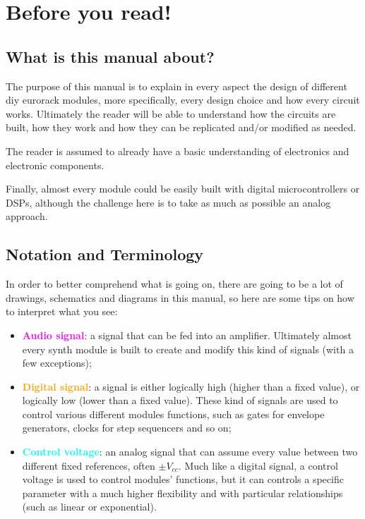 \chapter*{Before you read!}


\section*{What is this manual about?}

The purpose of this manual is to explain in every aspect the design of different diy
eurorack modules, more specifically, every design choice and how every circuit works.
Ultimately the reader will be able to understand how the circuits are built, how they work
and how they can be replicated and/or modified as needed.

The reader is assumed to already have a basic understanding of electronics and electronic
components.

Finally, almost every module could be easily built with digital microcontrollers or DSPs,
although the challenge here is to take as much as possible an analog approach.


\section*{Notation and Terminology}

In order to better comprehend what is going on, there are going to be a lot of drawings,
schematics and diagrams in this manual, so here are some tips on how to interpret what you
see:

\begin{itemize}
      \item
            \textbf{\textcolor{magenta}{Audio signal}}: a signal that can be fed into an
            amplifier. Ultimately almost every synth module is built to create and modify
            this kind of signals (with a few exceptions);
      \item
            \textbf{\textcolor{orange}{Digital signal}}: a signal is either logically high
            (higher than a fixed value), or logically low (lower than a fixed value).
            These kind of signals are used to control various different modules functions,
            such as gates for envelope generators, clocks for step sequencers and so on;
      \item
            \textbf{\textcolor{cyan}{Control voltage}}: an analog signal that can assume
            every value between two different fixed references, often $\pm V_{cc}$. Much
            like a digital signal, a control voltage is used to control modules' functions,
            but it can controls a specific parameter with a much higher flexibility and with
            particular relationships (such as linear or exponential).
\end{itemize}

